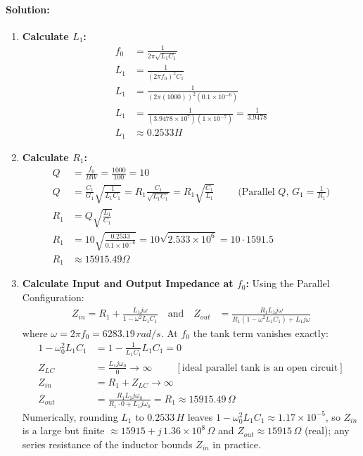 \paragraph{Solution:}
\begin{enumerate}
  \item \textbf{Calculate \(L_1\):}
    \begin{align*}
      f_0 &= \frac{1}{2\pi\sqrt{L_1 C_1}} \\
      L_1 &= \frac{1}{(2\pi f_0)^2 C_1} \\
      L_1 &= \frac{1}{(2\pi (1000))^2 (0.1 \times 10^{-6})} \\
      L_1 &= \frac{1}{(3.9478 \times 10^{7})(1 \times 10^{-7})} = \frac{1}{3.9478} \\
      L_1 &\approx 0.2533 H
    \end{align*}
  \item \textbf{Calculate \(R_1\):}
    \begin{align*}
      Q &= \frac{f_0}{BW} = \frac{1000}{100} = 10 \\
      Q &= \frac{C_1}{G_1}\sqrt{\frac{1}{L_1 C_1}} = R_1 \frac{C_1}{\sqrt{L_1 C_1}} = R_1 \sqrt{\frac{C_1}{L_1}} \hspace{1cm} \text{(Parallel \(Q\), \(G_1 = \frac{1}{R_1}\))} \\
      R_1 &= Q \sqrt{\frac{L_1}{C_1}} \\
      R_1 &= 10 \sqrt{\frac{0.2533}{0.1 \times 10^{-6}}} = 10 \sqrt{2.533 \times 10^{6}} = 10 \cdot 1591.5 \\
      R_1 &\approx 15915.49 \Omega
    \end{align*}
  \item \textbf{Calculate Input and Output Impedance at \(f_0\):}
    Using the Parallel Configuration:
    \begin{align*}
      Z_{in} = R_1 + \frac{L_1 j \omega}{1 - \omega^2 L_1 C_1}
      \quad \text{and} \quad
      Z_{out} &= \frac{R_1 L_1 j \omega}{R_1(1 - \omega^2 L_1 C_1) + L_1 j \omega}
    \end{align*}
    where \(\omega = 2 \pi f_0 = 6283.19 \, rad/s\). At \(f_0\) the tank
    term vanishes exactly:
    \begin{align*}
      1 - \omega_0^2 L_1 C_1 &= 1 - \frac{1}{L_1 C_1} L_1 C_1 = 0 \\
      Z_{LC} &= \frac{L_1 j \omega_0}{0} \to \infty \hspace{1cm} [\text{ideal parallel tank is an open circuit}] \\
      Z_{in} &= R_1 + Z_{LC} \to \infty \\
      Z_{out} &= \frac{R_1 L_1 j \omega_0}{R_1 \cdot 0 + L_1 j \omega_0} = R_1 \approx 15915.49 \, \Omega
    \end{align*}
    Numerically, rounding \(L_1\) to \(0.2533\,H\) leaves
    \(1 - \omega_0^2 L_1 C_1 \approx 1.17 \times 10^{-5}\), so \(Z_{in}\) is a
    large but finite \(\approx 15915 + j\,1.36 \times 10^{8}\,\Omega\) and
    \(Z_{out} \approx 15915\,\Omega\) (real); any series resistance of the
    inductor bounds \(Z_{in}\) in practice.
\end{enumerate}

